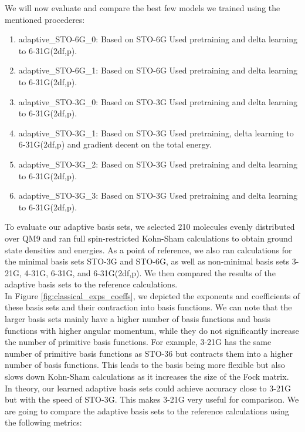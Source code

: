 We will now evaluate and compare the best few models we trained using the mentioned procederes:
\begin{enumerate}
    \item adaptive\_STO-6G\_0: Based on STO-6G Used pretraining and delta learning to 6-31G(2df,p).
    \item adaptive\_STO-6G\_1: Based on STO-6G Used pretraining and delta learning to 6-31G(2df,p).
    \item adaptive\_STO-3G\_0: Based on STO-3G Used pretraining and delta learning to 6-31G(2df,p).
    \item adaptive\_STO-3G\_1: Based on STO-3G Used pretraining, delta learning to 6-31G(2df,p) and gradient decent on the total energy.
    \item adaptive\_STO-3G\_2: Based on STO-3G Used pretraining and delta learning to 6-31G(2df,p).
    \item adaptive\_STO-3G\_3: Based on STO-3G Used pretraining and delta learning to 6-31G(2df,p).
\end{enumerate}
To evaluate our adaptive basis sets, we selected 210 molecules evenly distributed over QM9 and ran full spin-restricted Kohn-Sham calculations to obtain ground state densities and energies. As a point of reference, we also ran calculations for the minimal basis sets STO-3G and STO-6G, as well as non-minimal basis sets 3-21G, 4-31G, 6-31G, and 6-31G(2df,p). We then compared the results of the adaptive basis sets to the reference calculations.\\


In Figure \ref{fig:classical_exps_coeffs}, we depicted the exponents and coefficients of these basis sets and their contraction into basis functions. We can note that the larger basis sets mainly have a higher number of basis functions and basis functions with higher angular momentum, while they do not significantly increase the number of primitive basis functions. For example, 3-21G has the same number of primitive basis functions as STO-36 but contracts them into a higher number of basis functions. This leads to the basis being more flexible but also slows down Kohn-Sham calculations as it increases the size of the Fock matrix.\\


In theory, our learned adaptive basis sets could achieve accuracy close to 3-21G but with the speed of STO-3G. This makes 3-21G very useful for comparison. We are going to compare the adaptive basis sets to the reference calculations using the following metrics:\\

